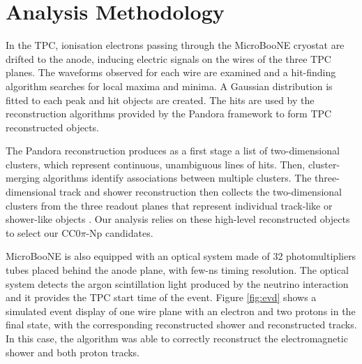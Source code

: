 
\section{Analysis Methodology}
\label{sec:methodology}


In the TPC, ionisation electrons passing through the MicroBooNE cryostat are drifted to the anode, inducing electric signals on the wires of the three TPC planes. The waveforms observed for each wire are examined and a hit-finding algorithm searches for local maxima and minima. A Gaussian distribution is fitted to each peak and hit objects are created. The hits are used by the reconstruction algorithms provided by the Pandora framework \cite{pandora} to form TPC reconstructed objects. 

The Pandora reconstruction produces as a first stage a list of two-dimensional clusters, which represent continuous, unambiguous lines of hits. Then, cluster-merging algorithms identify associations between multiple clusters. The three-dimensional track and shower reconstruction then collects the two-dimensional clusters from the three readout planes that represent individual track-like or shower-like objects \cite{pandora2}. Our analysis relies on these high-level reconstructed objects to select our CC0$\pi$-Np candidates.

MicroBooNE is also equipped with an optical system made of 32 photomultipliers tubes placed behind the anode plane, with few-ns timing resolution. The optical system detects the argon scintillation light produced by the neutrino interaction and it provides the TPC start time of the event.
Figure \ref{fig:evd} shows a simulated event display of one wire plane with an electron and two protons in the final state, with the corresponding reconstructed shower and reconstructed tracks. In this case, the algorithm was able to correctly reconstruct the electromagnetic shower and both proton tracks.


